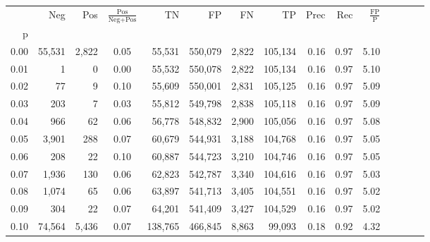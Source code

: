 \begin{tabular}{rrrcrrrrrrrrrrr}
\toprule
{} &     Neg &     Pos & $\frac{\text{Pos}}{\text{Neg}+\text{Pos}}$ &       TN &       FP &       FN &       TP &  Prec &   Rec & $\frac{\text{FP}}{\text{P}}$ \\
p    &         &         &                                            &          &          &          &          &       &       &                              \\
\midrule
0.00 &  55,531 &   2,822 &                                       0.05 &   55,531 &  550,079 &    2,822 &  105,134 &  0.16 &  0.97 &                         5.10 \\
0.01 &       1 &       0 &                                       0.00 &   55,532 &  550,078 &    2,822 &  105,134 &  0.16 &  0.97 &                         5.10 \\
0.02 &      77 &       9 &                                       0.10 &   55,609 &  550,001 &    2,831 &  105,125 &  0.16 &  0.97 &                         5.09 \\
0.03 &     203 &       7 &                                       0.03 &   55,812 &  549,798 &    2,838 &  105,118 &  0.16 &  0.97 &                         5.09 \\
0.04 &     966 &      62 &                                       0.06 &   56,778 &  548,832 &    2,900 &  105,056 &  0.16 &  0.97 &                         5.08 \\
0.05 &   3,901 &     288 &                                       0.07 &   60,679 &  544,931 &    3,188 &  104,768 &  0.16 &  0.97 &                         5.05 \\
0.06 &     208 &      22 &                                       0.10 &   60,887 &  544,723 &    3,210 &  104,746 &  0.16 &  0.97 &                         5.05 \\
0.07 &   1,936 &     130 &                                       0.06 &   62,823 &  542,787 &    3,340 &  104,616 &  0.16 &  0.97 &                         5.03 \\
0.08 &   1,074 &      65 &                                       0.06 &   63,897 &  541,713 &    3,405 &  104,551 &  0.16 &  0.97 &                         5.02 \\
0.09 &     304 &      22 &                                       0.07 &   64,201 &  541,409 &    3,427 &  104,529 &  0.16 &  0.97 &                         5.02 \\
0.10 &  74,564 &   5,436 &                                       0.07 &  138,765 &  466,845 &    8,863 &   99,093 &  0.18 &  0.92 &                         4.32 \\

\end{tabular}
